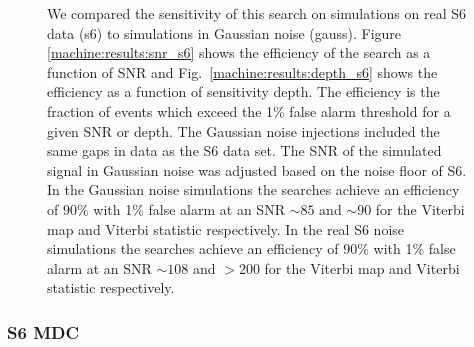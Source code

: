 \begin{figure}[h]
	\caption[Gaussian noise results from SOAP and \gls{CNN} search.]{\label{machine:results:s6gauss} We compared the sensitivity of this
	search on simulations on real S6 data (s6) to simulations in Gaussian noise
	(gauss). Figure \ref{machine:results:snr_s6} shows the efficiency of the search as a function of \gls{SNR} and Fig.~\ref{machine:results:depth_s6} shows the efficiency as a function of sensitivity depth.
	The efficiency is the fraction of events which exceed the 1\% false alarm threshold for a given \gls{SNR} or depth.
	The Gaussian noise injections included the same gaps in data as the S6
	data set. The \gls{SNR} of the simulated signal in Gaussian noise was adjusted
	based on the noise floor of S6. 
	In the Gaussian noise simulations the searches achieve an efficiency of $90\%$ with 1\% false alarm at an \gls{SNR} $\sim 85$ and $\sim 90$ for the Viterbi map and Viterbi statistic respectively.
	In the real S6 noise simulations the searches achieve an efficiency of $90\%$ with 1\% false alarm at an \gls{SNR} $\sim 108$ and $ > 200$ for the Viterbi map and Viterbi statistic respectively.}
	
\end{figure}


\subsubsection{S6 \gls{MDC}}

